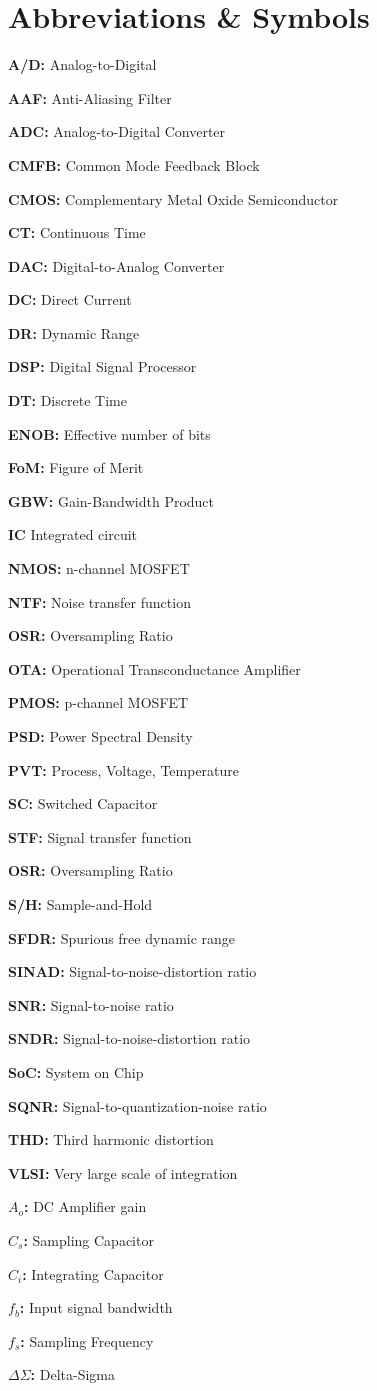 \chapter*{Abbreviations \& Symbols}


\textbf{A/D:} Analog-to-Digital 


\textbf{AAF:} Anti-Aliasing Filter  


\textbf{ADC:} Analog-to-Digital Converter  


\textbf{CMFB:} Common Mode Feedback Block  

\textbf{CMOS:} Complementary Metal Oxide Semiconductor  


\textbf{CT:} Continuous Time  


\textbf{DAC:} Digital-to-Analog Converter  


\textbf{DC:} Direct Current

\textbf{DR:} Dynamic Range

\textbf{DSP:} Digital Signal Processor

\textbf{DT:} Discrete Time

\textbf{ENOB:} Effective number of bits

\textbf{FoM:} Figure of Merit

\textbf{GBW:} Gain-Bandwidth Product

\textbf{IC} Integrated circuit

\textbf{NMOS:} n-channel MOSFET

\textbf{NTF:} Noise transfer function

\textbf{OSR:} Oversampling Ratio

\textbf{OTA:} Operational Transconductance Amplifier

\textbf{PMOS:} p-channel MOSFET

\textbf{PSD:} Power Spectral Density

\textbf{PVT:} Process, Voltage, Temperature

\textbf{SC:} Switched Capacitor

\textbf{STF:} Signal transfer function

\textbf{OSR:} Oversampling Ratio

\textbf{S/H:} Sample-and-Hold

\textbf{SFDR:} Spurious free dynamic range

\textbf{SINAD:} Signal-to-noise-distortion ratio

\textbf{SNR:} Signal-to-noise ratio

\textbf{SNDR:} Signal-to-noise-distortion ratio

\textbf{SoC:} System on Chip

\textbf{SQNR:} Signal-to-quantization-noise ratio

\textbf{THD:} Third harmonic distortion

\textbf{VLSI:} Very large scale of integration

\textbf{$A_o$:} DC Amplifier gain

\textbf{$C_s$:} Sampling Capacitor

\textbf{$C_i$:} Integrating Capacitor

\textbf{$f_b$:} Input signal bandwidth

\textbf{$f_s$:} Sampling Frequency

\textbf{$\Delta\Sigma$:} Delta-Sigma


